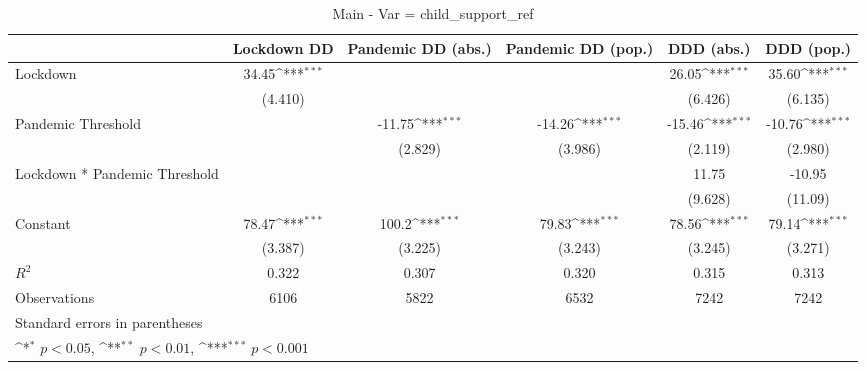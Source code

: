 \documentclass{article}
\begin{document}
{
\def\sym#1{\ifmmode^{#1}\else\(^{#1}\)\fi}
\begin{longtable}{l*{5}{c}}
\caption{Main - Var = child\_support\_ref}\\
\hline\hline\endfirsthead\hline\endhead\hline\endfoot\endlastfoot
                &\multicolumn{1}{c}{Lockdown DD}&\multicolumn{1}{c}{Pandemic DD (abs.)}&\multicolumn{1}{c}{Pandemic DD (pop.)}&\multicolumn{1}{c}{DDD (abs.)}&\multicolumn{1}{c}{DDD (pop.)}\\
\hline
Lockdown        &    34.45\sym{***}&                  &                  &    26.05\sym{***}&    35.60\sym{***}\\
                &  (4.410)         &                  &                  &  (6.426)         &  (6.135)         \\
Pandemic Threshold&                  &   -11.75\sym{***}&   -14.26\sym{***}&   -15.46\sym{***}&   -10.76\sym{***}\\
                &                  &  (2.829)         &  (3.986)         &  (2.119)         &  (2.980)         \\
Lockdown * Pandemic Threshold&                  &                  &                  &    11.75         &   -10.95         \\
                &                  &                  &                  &  (9.628)         &  (11.09)         \\
Constant        &    78.47\sym{***}&    100.2\sym{***}&    79.83\sym{***}&    78.56\sym{***}&    79.14\sym{***}\\
                &  (3.387)         &  (3.225)         &  (3.243)         &  (3.245)         &  (3.271)         \\
\hline
\(R^{2}\)       &    0.322         &    0.307         &    0.320         &    0.315         &    0.313         \\
Observations    &     6106         &     5822         &     6532         &     7242         &     7242         \\
\hline\hline
\multicolumn{6}{l}{\footnotesize Standard errors in parentheses}\\
\multicolumn{6}{l}{\footnotesize \sym{*} \(p<0.05\), \sym{**} \(p<0.01\), \sym{***} \(p<0.001\)}\\
\end{longtable}
}
\end{document}
